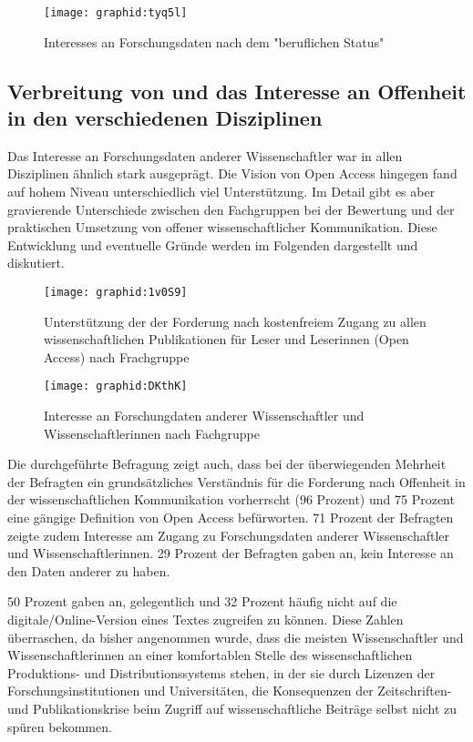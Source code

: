 \begin{figure}[h!]
\texttt{[image: graphid:tyq5l]}
\caption{Interesses an Forschungsdaten nach dem "beruflichen Status"}
\end{figure}

\subsection{Verbreitung von und das Interesse an Offenheit in den verschiedenen Disziplinen}

Das Interesse an Forschungsdaten anderer Wissenschaftler war in allen Disziplinen ähnlich stark ausgeprägt. Die Vision von Open Access hingegen fand auf hohem Niveau unterschiedlich viel Unterstützung. Im Detail gibt es aber gravierende Unterschiede zwischen den Fachgruppen bei der Bewertung und der praktischen Umsetzung von offener wissenschaftlicher Kommunikation. Diese Entwicklung und eventuelle Gründe werden im Folgenden dargestellt und diskutiert.

\begin{figure}[h!]
\texttt{[image: graphid:1v0S9]}
\caption{Unterstützung der der Forderung nach kostenfreiem Zugang zu allen wissenschaftlichen Publikationen für Leser und Leserinnen (Open Access) nach Frachgruppe}
\end{figure}

\begin{figure}[h!]
\texttt{[image: graphid:DKthK]}
\caption{Interesse an Forschungdaten anderer Wissenschaftler und Wissenschaftlerinnen nach Fachgruppe}
\end{figure}

Die durchgeführte Befragung zeigt auch, dass bei der überwiegenden Mehrheit der Befragten ein grundsätzliches Verständnis für die Forderung nach Offenheit in der wissenschaftlichen Kommunikation vorherrscht (96 Prozent) und 75 Prozent eine gängige Definition von Open Access befürworten. 71 Prozent der Befragten zeigte zudem Interesse am Zugang zu Forschungsdaten anderer Wissenschaftler und Wissenschaftlerinnen. 29 Prozent der Befragten gaben an, kein Interesse an den Daten anderer zu haben.

50 Prozent gaben an, gelegentlich und 32 Prozent häufig nicht auf die digitale/Online-Version eines Textes zugreifen zu können. Diese Zahlen überraschen, da bisher angenommen wurde, dass die meisten Wissenschaftler und Wissenschaftlerinnen an einer komfortablen Stelle des wissenschaftlichen Produktions- und Distributionssystems \cite{Herb_2010} stehen, in der sie durch Lizenzen der Forschungsinstitutionen und Universitäten, die Konsequenzen der Zeitschriften- und Publikationskrise beim Zugriff auf wissenschaftliche Beiträge selbst nicht zu spüren bekommen.

